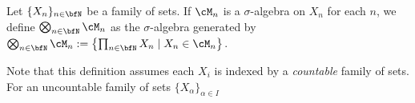     \begin{definition}
        Let $\{X_n\}_{n \in \bfN}$ be a family of sets. If $\cM_n$ is a $\sigma$-algebra on $X_n$ for each $n$, we define $\bigotimes_{n \in \bfN}\cM_n$ as the $\sigma$-algebra generated by $\bigotimes_{n \in \bfN}\cM_n := \left\{ \prod_{n \in \bfN}X_n \mid X_n \in \cM_n\right\}$.
    \end{definition}

    Note that this definition assumes each $X_i$ is indexed by a \textit{countable} family of sets. For an uncountable family of sets $\{X_\alpha\}_{\alpha \in I}$


    
